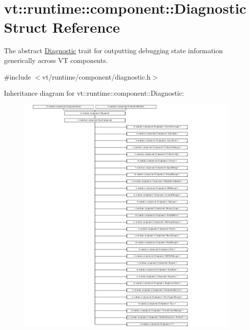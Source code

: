 \hypertarget{structvt_1_1runtime_1_1component_1_1_diagnostic}{}\section{vt\+:\+:runtime\+:\+:component\+:\+:Diagnostic Struct Reference}
\label{structvt_1_1runtime_1_1component_1_1_diagnostic}


The abstract {\ttfamily \hyperlink{structvt_1_1runtime_1_1component_1_1_diagnostic}{Diagnostic}} trait for outputting debugging state information generically across VT components.  




{\ttfamily \#include $<$vt/runtime/component/diagnostic.\+h$>$}

Inheritance diagram for vt\+:\+:runtime\+:\+:component\+:\+:Diagnostic\+:\begin{figure}[H]
\begin{center}
\leavevmode
\includegraphics[height=12.000000cm]{structvt_1_1runtime_1_1component_1_1_diagnostic}
\end{center}
\end{figure}
